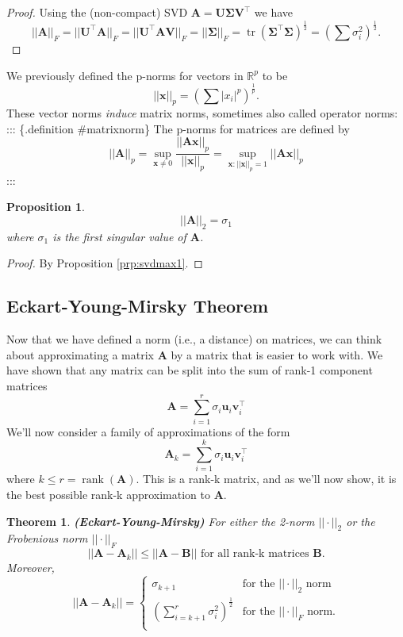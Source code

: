 \documentclass[
]{book}
\newtheorem{theorem}{Theorem}[chapter]
\newtheorem{proposition}{Proposition}[chapter]
\theoremstyle{definition}
\theoremstyle{definition}
\theoremstyle{definition}
\theoremstyle{definition}
\theoremstyle{remark}
\begin{document}
\begin{proof}
Using the (non-compact) SVD
\(\mathbf A= \mathbf U\boldsymbol{\Sigma}\mathbf V^\top\)
we have \[||\mathbf A||_F=||\mathbf U^\top \mathbf A||_F = ||\mathbf U^\top \mathbf A\mathbf V||_F = ||\boldsymbol{\Sigma}||_F=\operatorname{tr}(\boldsymbol{\Sigma}^\top\boldsymbol{\Sigma})^\frac{1}{2}=\left(\sum \sigma_i^2 \right)^\frac{1}{2}.\]
\end{proof}

We previously defined the p-norms for vectors in \(\mathbb{R}^p\) to be
\[||\mathbf x||_p = \left(\sum |x_i|^p\right)^{\frac{1}{p}}.\]
These vector norms \emph{induce} matrix norms, sometimes also called operator norms:
::: \{.definition \#matrixnorm\}
The p-norms for matrices are defined by
\[||\mathbf A||_p = \sup_{\mathbf x\not=0} \frac{||\mathbf A\mathbf x||_p}{||\mathbf x||_p} = \sup_{\mathbf x: ||\mathbf x||_p=1} ||\mathbf A\mathbf x||_p\]
:::

\begin{proposition}
\protect\hypertarget{prp:L2matrixnorm}{}\label{prp:L2matrixnorm}\[||\mathbf A||_2 = \sigma_1\]
where \(\sigma_1\) is the first singular value of \(\mathbf A\).
\end{proposition}

\begin{proof}
By Proposition \ref{prp:svdmax1}.
\end{proof}

\hypertarget{eckart-young-mirsky-theorem}{%
\subsection{Eckart-Young-Mirsky Theorem}\label{eckart-young-mirsky-theorem}}

Now that we have defined a norm (i.e., a distance) on matrices, we can think about approximating a matrix \(\mathbf A\) by a matrix that is easier to work with. We have shown that any matrix can be split into the sum of rank-1 component matrices
\[\mathbf A= \sum_{i=1}^r \sigma_i \mathbf u_i \mathbf v_i^\top\]
We'll now consider a family of approximations of the form
\begin{equation}
\mathbf A_k = \sum_{i=1}^k \sigma_i \mathbf u_i \mathbf v_i^\top
\label{eq:svdreduced}
\end{equation}
where \(k\leq r=\operatorname{rank}(\mathbf A)\). This is a rank-k matrix, and as we'll now show, it is the best possible rank-k approximation to \(\mathbf A\).

\begin{theorem}
\protect\hypertarget{thm:Eckart-Young}{}\label{thm:Eckart-Young}\textbf{(Eckart-Young-Mirsky)} For either the 2-norm \(||\cdot||_2\) or the Frobenious norm \(||\cdot||_F\)
\[||\mathbf A-\mathbf A_k|| \leq ||\mathbf A-\mathbf B|| \mbox{ for all rank-k matrices }\mathbf B.\]
Moreover,
\[||\mathbf A-\mathbf A_k|| =\begin{cases}
\sigma_{k+1} &\mbox{for the }||\cdot||_2 \mbox{ norm}\\
\left(\sum_{i=k+1}^r \sigma_{i}^2\right)^{\frac{1}{2}} &\mbox{for the }||\cdot||_F \mbox{ norm.}\\
\end{cases}\]
\end{theorem}
\end{document}
